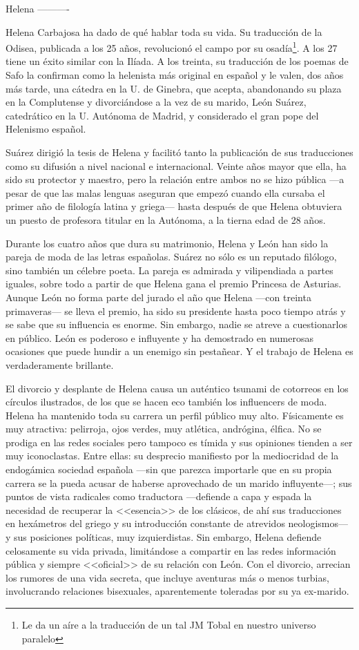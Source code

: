 Helena
----------

Helena Carbajosa ha dado de qué hablar toda su vida. Su traducción de la Odisea, publicada a los 25 años, revolucionó el campo por su osadía\footnote{Le da un aíre a la traducción de un tal JM Tobal en nuestro universo paralelo}. A los 27 tiene un éxito similar con la Ilíada. A los treinta, su traducción de los poemas de Safo la confirman como la helenista más original en español y le valen, dos años más tarde, una cátedra en la U. de Ginebra, que acepta, abandonando su plaza en la Complutense y divorciándose a la vez de su marido, León Suárez, catedrático en la U. Autónoma de Madrid, y considerado el gran pope del Helenismo español. 

Suárez dirigió la tesis de Helena y facilitó tanto la publicación de sus traducciones como su difusión a nivel nacional e internacional. Veinte años mayor que ella, ha sido su protector y maestro, pero la relación entre ambos no se hizo pública ---a pesar de que las malas lenguas aseguran que empezó cuando ella cursaba el primer año de filología latina y griega--- hasta después de que Helena obtuviera un puesto de profesora titular en la Autónoma, a la tierna edad de 28 años.

 Durante los cuatro años que dura su matrimonio, Helena y León han sido la pareja de moda de las letras españolas. Suárez no sólo es un reputado filólogo, sino también un célebre poeta. La pareja es admirada y vilipendiada a partes iguales, sobre todo a partir de que Helena gana el premio Princesa de Asturias. Aunque León no forma parte del jurado el año que Helena ---con treinta primaveras--- se lleva el premio, ha sido su presidente hasta poco tiempo atrás y se sabe que su influencia es enorme. Sin embargo, nadie se atreve a cuestionarlos en público. León es poderoso e influyente y ha demostrado en numerosas ocasiones que puede hundir a un enemigo sin pestañear. Y el trabajo de Helena es verdaderamente brillante. 
 
 El divorcio y desplante de Helena causa un auténtico tsunami de cotorreos en los círculos ilustrados, de los que se hacen eco también los influencers de moda. Helena ha mantenido toda su carrera un perfil público muy alto. Físicamente es muy atractiva: pelirroja, ojos verdes, muy atlética, andrógina, élfica. No se prodiga en las redes sociales pero tampoco es tímida y sus opiniones tienden a ser muy iconoclastas. Entre ellas: su desprecio manifiesto por la mediocridad de la endogámica sociedad española ---sin que parezca importarle que en su propia carrera se la pueda acusar de haberse aprovechado de un marido influyente---; sus puntos de vista radicales como traductora ---defiende a capa y espada la necesidad de recuperar la <<esencia>> de los clásicos, de ahí sus traducciones en hexámetros del griego y su introducción constante de atrevidos neologismos--- y sus posiciones políticas, muy izquierdistas. Sin embargo, Helena defiende celosamente su vida privada, limitándose a compartir en las redes información pública y siempre <<oficial>> de su relación con León. Con el divorcio, arrecian los rumores de una vida secreta, que incluye aventuras más o menos turbias, involucrando relaciones bisexuales, aparentemente toleradas por su ya ex-marido.  
 
